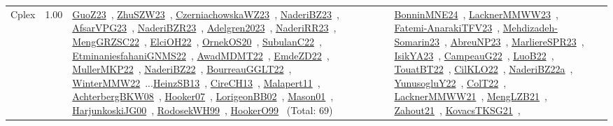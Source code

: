 {\begin{longtable}{p{3cm}r>{\raggedright\arraybackslash}p{6cm}>{\raggedright\arraybackslash}p{6cm}>{\raggedright\arraybackslash}p{8cm}}
\index{Cplex}\index{CPSystems!Cplex}Cplex &  1.00 & \href{../works/GuoZ23.pdf}{GuoZ23}~\cite{GuoZ23}, \href{../works/ZhuSZW23.pdf}{ZhuSZW23}~\cite{ZhuSZW23}, \href{../works/CzerniachowskaWZ23.pdf}{CzerniachowskaWZ23}~\cite{CzerniachowskaWZ23}, \href{../works/NaderiBZ23.pdf}{NaderiBZ23}~\cite{NaderiBZ23}, \href{../works/AfsarVPG23.pdf}{AfsarVPG23}~\cite{AfsarVPG23}, \href{../works/NaderiBZR23.pdf}{NaderiBZR23}~\cite{NaderiBZR23}, \href{../works/Adelgren2023.pdf}{Adelgren2023}~\cite{Adelgren2023}, \href{../works/NaderiRR23.pdf}{NaderiRR23}~\cite{NaderiRR23}, \href{../works/MengGRZSC22.pdf}{MengGRZSC22}~\cite{MengGRZSC22}, \href{../works/ElciOH22.pdf}{ElciOH22}~\cite{ElciOH22}, \href{../works/OrnekOS20.pdf}{OrnekOS20}~\cite{OrnekOS20}, \href{../works/SubulanC22.pdf}{SubulanC22}~\cite{SubulanC22}, \href{../works/EtminaniesfahaniGNMS22.pdf}{EtminaniesfahaniGNMS22}~\cite{EtminaniesfahaniGNMS22}, \href{../works/AwadMDMT22.pdf}{AwadMDMT22}~\cite{AwadMDMT22}, \href{../works/EmdeZD22.pdf}{EmdeZD22}~\cite{EmdeZD22}, \href{../works/MullerMKP22.pdf}{MullerMKP22}~\cite{MullerMKP22}, \href{../works/NaderiBZ22.pdf}{NaderiBZ22}~\cite{NaderiBZ22}, \href{../works/BourreauGGLT22.pdf}{BourreauGGLT22}~\cite{BourreauGGLT22}, \href{../works/WinterMMW22.pdf}{WinterMMW22}~\cite{WinterMMW22}...\href{../works/HeinzSB13.pdf}{HeinzSB13}~\cite{HeinzSB13}, \href{../works/CireCH13.pdf}{CireCH13}~\cite{CireCH13}, \href{../works/Malapert11.pdf}{Malapert11}~\cite{Malapert11}, \href{../works/AchterbergBKW08.pdf}{AchterbergBKW08}~\cite{AchterbergBKW08}, \href{../works/Hooker07.pdf}{Hooker07}~\cite{Hooker07}, \href{../works/LorigeonBB02.pdf}{LorigeonBB02}~\cite{LorigeonBB02}, \href{../works/Mason01.pdf}{Mason01}~\cite{Mason01}, \href{../works/HarjunkoskiJG00.pdf}{HarjunkoskiJG00}~\cite{HarjunkoskiJG00}, \href{../works/RodosekWH99.pdf}{RodosekWH99}~\cite{RodosekWH99}, \href{../works/HookerO99.pdf}{HookerO99}~\cite{HookerO99} (Total: 69) & \href{../works/BonninMNE24.pdf}{BonninMNE24}~\cite{BonninMNE24}, \href{../works/LacknerMMWW23.pdf}{LacknerMMWW23}~\cite{LacknerMMWW23}, \href{../works/Fatemi-AnarakiTFV23.pdf}{Fatemi-AnarakiTFV23}~\cite{Fatemi-AnarakiTFV23}, \href{../works/Mehdizadeh-Somarin23.pdf}{Mehdizadeh-Somarin23}~\cite{Mehdizadeh-Somarin23}, \href{../works/AbreuNP23.pdf}{AbreuNP23}~\cite{AbreuNP23}, \href{../works/MarliereSPR23.pdf}{MarliereSPR23}~\cite{MarliereSPR23}, \href{../works/IsikYA23.pdf}{IsikYA23}~\cite{IsikYA23}, \href{../works/CampeauG22.pdf}{CampeauG22}~\cite{CampeauG22}, \href{../works/LuoB22.pdf}{LuoB22}~\cite{LuoB22}, \href{../works/TouatBT22.pdf}{TouatBT22}~\cite{TouatBT22}, \href{../works/CilKLO22.pdf}{CilKLO22}~\cite{CilKLO22}, \href{../works/NaderiBZ22a.pdf}{NaderiBZ22a}~\cite{NaderiBZ22a}, \href{../works/YunusogluY22.pdf}{YunusogluY22}~\cite{YunusogluY22}, \href{../works/ColT22.pdf}{ColT22}~\cite{ColT22}, \href{../works/LacknerMMWW21.pdf}{LacknerMMWW21}~\cite{LacknerMMWW21}, \href{../works/MengLZB21.pdf}{MengLZB21}~\cite{MengLZB21}, \href{../works/Zahout21.pdf}{Zahout21}~\cite{Zahout21}, \href{../works/KovacsTKSG21.pdf}{KovacsTKSG21}~\cite{KovacsTKSG21}, 
\end{longtable}}
